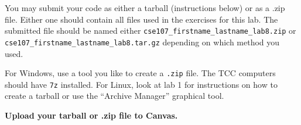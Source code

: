 \documentclass[11pt]{cselabheader}
\begin{document}
You may submit your code as either a tarball (instructions below) or as a .zip
file. Either one should contain all files used in the exercises for this lab.
The submitted file should be named either
\texttt{cse107\_firstname\_lastname\_lab8.zip} or
\texttt{cse107\_firstname\_lastname\_lab8.tar.gz} depending on which method you
used.

For Windows, use a tool you like to create a \texttt{.zip} file. The TCC
computers should have \texttt{7z} installed. For Linux, look at lab 1 for
instructions on how to create a tarball or use the ``Archive Manager'' graphical
tool.

\begin{center}
  \textbf{Upload your tarball or .zip file to Canvas.}
\end{center}
\end{document}
